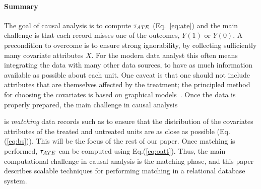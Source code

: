 \vspace{-.3cm}
\paragraph*{Summary}
The goal of causal analysis is to compute ${\tau_{ATE}}$ (Eq.~\ref{eq:ate})
and the main challenge is that each record misses one of the outcomes,
$Y(1)$ or $Y(0)$.  A precondition to overcome is to ensure strong
ignorability, by collecting sufficiently many covariate attributes
$X$.  For the modern data analyst this often means integrating the
data with many other data sources, to have as much information
available as possible about each unit.  One caveat is that one should
not include attributes that are themselves affected by the treatment;
the principled method for choosing the covariates is based on
graphical models~\cite{de2011covariate}.  Once the data is properly
prepared, the main challenge in causal analysis  is {\em matching} data records such as to
ensure that the distribution of the covariates attributes of the
treated and untreated units are as close as possible
(Eq.(\ref{eq:bs})).  This will be the focus of the rest of our paper.
Once matching is performed, ${\tau_{ATE}}$ can be computed using
Eq.(\ref{eq:oatt}).  Thus, the main computational challenge in causal
analysis is the matching phase, and this paper describes scalable
techniques for performing matching in a relational database system.

